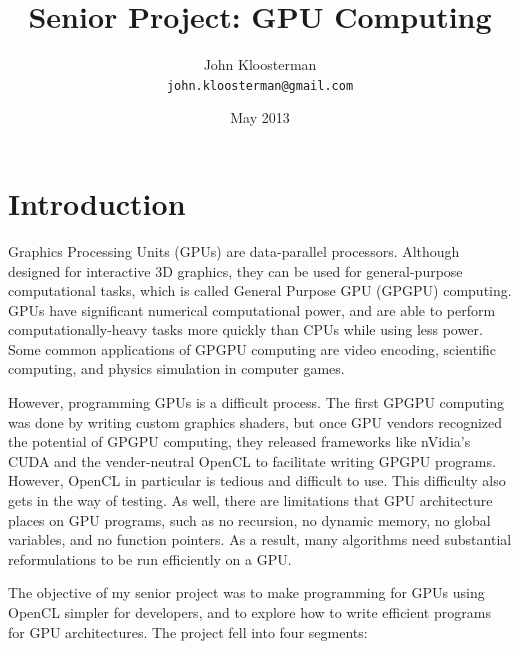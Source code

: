 \documentclass{article}
\begin{document}
\lstset{ 
  language=C++,
  belowcaptionskip=1\baselineskip,
  xleftmargin=\parindent,
  basicstyle=\footnotesize\ttfamily
 }

\title{Senior Project: GPU Computing}
\author{John Kloosterman \\
  \texttt{john.kloosterman@gmail.com}}
\date{May 2013}
\maketitle


\section{Introduction}

Graphics Processing Units (GPUs) are data-parallel processors. Although designed for interactive 3D graphics, they can be used for general-purpose computational tasks, which is called General Purpose GPU (GPGPU) computing. GPUs have significant numerical computational power, and are able to perform computationally-heavy tasks more quickly than CPUs while using less power. Some common applications of GPGPU computing are video encoding, scientific computing, and physics simulation in computer games.

However, programming GPUs is a difficult process. The first GPGPU computing was done by writing custom graphics shaders, but once GPU vendors recognized the potential of GPGPU computing, they released frameworks like nVidia's CUDA and the vender-neutral OpenCL to facilitate writing GPGPU programs. However, OpenCL in particular is tedious and difficult to use. This difficulty also gets in the way of testing. As well, there are limitations that GPU architecture places on GPU programs, such as no recursion, no dynamic memory, no global variables, and no function pointers. As a result, many algorithms need substantial reformulations to be run efficiently on a GPU.

The objective of my senior project was to make programming for GPUs using OpenCL simpler for developers, and to explore how to write efficient programs for GPU architectures. The project fell into four segments:
\end{document}
